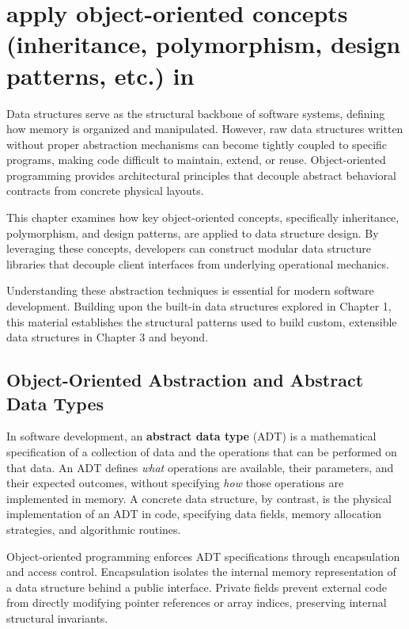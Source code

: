 \documentclass[12pt]{report}
\begin{document}
\pagestyle{plain}
\setcounter{page}{12}
\setcounter{chapter}{1}
\chapter{apply object-oriented concepts (inheritance, polymorphism, design patterns, etc.) in}

Data structures serve as the structural backbone of software systems, defining how memory is organized and manipulated. However, raw data structures written without proper abstraction mechanisms can become tightly coupled to specific programs, making code difficult to maintain, extend, or reuse. Object-oriented programming provides architectural principles that decouple abstract behavioral contracts from concrete physical layouts.

This chapter examines how key object-oriented concepts, specifically inheritance, polymorphism, and design patterns, are applied to data structure design. By leveraging these concepts, developers can construct modular data structure libraries that decouple client interfaces from underlying operational mechanics.

Understanding these abstraction techniques is essential for modern software development. Building upon the built-in data structures explored in Chapter 1, this material establishes the structural patterns used to build custom, extensible data structures in Chapter 3 and beyond.

\section{Object-Oriented Abstraction and Abstract Data Types}

In software development, an \textbf{abstract data type} (ADT) is a mathematical specification of a collection of data and the operations that can be performed on that data. An ADT defines \textit{what} operations are available, their parameters, and their expected outcomes, without specifying \textit{how} those operations are implemented in memory. A concrete data structure, by contrast, is the physical implementation of an ADT in code, specifying data fields, memory allocation strategies, and algorithmic routines.

Object-oriented programming enforces ADT specifications through encapsulation and access control. Encapsulation isolates the internal memory representation of a data structure behind a public interface. Private fields prevent external code from directly modifying pointer references or array indices, preserving internal structural invariants.
\end{document}
